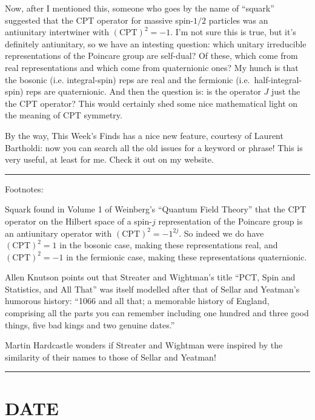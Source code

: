\documentclass{article}
\begin{document}
Now, after I mentioned this, someone who goes by the name of ``squark''
suggested that the CPT operator for massive spin-\(1/2\) particles was
an antiunitary intertwiner with \((\mathrm{CPT})^2 = -1\). I'm not sure
this is true, but it's definitely antiunitary, so we have an intesting
question: which unitary irreducible representations of the Poincare
group are self-dual? Of these, which come from real representations and
which come from quaternionic ones? My hunch is that the bosonic (i.e.
integral-spin) reps are real and the fermionic (i.e.~half-integral-spin)
reps are quaternionic. And then the question is: is the operator \(J\)
just the the CPT operator? This would certainly shed some nice
mathematical light on the meaning of CPT symmetry.

By the way, This Week's Finds has a nice new feature, courtesy of
Laurent Bartholdi: now you can search all the old issues for a keyword
or phrase! This is very useful, at least for me. Check it out on my
website.

\begin{center}\rule{0.5\linewidth}{0.5pt}\end{center}

Footnotes:

Squark found in Volume 1 of Weinberg's ``Quantum Field Theory'' that the
CPT operator on the Hilbert space of a spin-\(j\) representation of the
Poincare group is an antiunitary operator with
\((\mathrm{CPT})^2 = -1^{2j}\). So indeed we do have
\((\mathrm{CPT})^2 = 1\) in the bosonic case, making these
representations real, and \((\mathrm{CPT})^2 = -1\) in the fermionic
case, making these representations quaternionic.

Allen Knutson points out that Streater and Wightman's title ``PCT, Spin
and Statistics, and All That'' was itself modelled after that of Sellar
and Yeatman's humorous history: ``1066 and all that; a memorable history
of England, comprising all the parts you can remember including one
hundred and three good things, five bad kings and two genuine dates.''

Martin Hardcastle wonders if Streater and Wightman were inspired by the
similarity of their names to those of Sellar and Yeatman!

\begin{center}\rule{0.5\linewidth}{0.5pt}\end{center}
\hypertarget{week157}{%
\section{DATE}\label{week157}}
\end{document}

